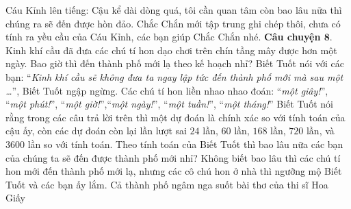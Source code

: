 	Cáu Kỉnh lên tiếng: Cậu kể dài dòng quá, tôi cần quan tâm còn bao lâu nữa thì chúng ra sẽ đến được hòn đảo. Chắc Chắn mới tập trung ghi chép thôi, chưa có tính ra yều cầu của Cáu Kỉnh, các bạn giúp Chắc Chắn nhé. 
	\vskip 0.1cm
	\textbf{\color{toancuabi}Câu chuyện $\pmb{8.}$} Kinh khí cầu đã đưa các chú tí hon dạo chơi trên chín tầng mây được hơn một ngày. Bao giờ thì đến thành phố mới lạ theo kế hoạch nhỉ? Biết Tuốt nói với các bạn:
	\vskip 0.1cm
	“\textit{Kinh khí cầu sẽ không đưa ta ngay lập tức đến thành phố mới mà sau một …}”, Biết Tuốt ngập ngừng. Các chú tí hon liền nhao nhao đoán: “\textit{một giây!}”, “\textit{một phút!}”, “\textit{một giờ!}”,“\textit{một ngày!}”, “\textit{một tuần!}”, “\textit{một tháng!}” Biết Tuốt nói rằng trong các câu trả lời trên thì một dự đoán là chính xác so với tính toán của cậu ấy, còn các dự đoán còn lại lần lượt sai $24$ lần, $60$ lần, $168$ lần, $720$ lần, và $3600$ lần so với tính toán. Theo tính toán của Biết Tuốt thì bao lâu nữa các bạn của chúng ta sẽ đến được thành phố mới nhỉ?
	\vskip 0.1cm
	Không biết bao lâu thì các chú tí hon mới đến thành phố mới lạ, nhưng các cô chú hon ở nhà thì ngưỡng mộ Biết Tuốt và các bạn ấy lắm. Cả thành phố ngâm nga suốt bài thơ của thi sĩ Hoa Giấy
	
